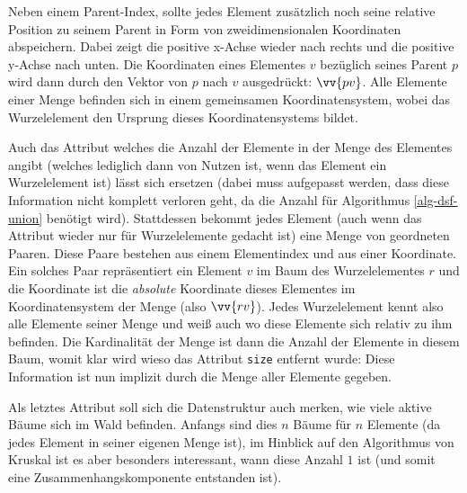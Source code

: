 \documentclass{whswinvcbook}
\begin{document}
Neben einem Parent-Index, sollte jedes Element zusätzlich noch seine relative Position zu seinem Parent in Form von zweidimensionalen Koordinaten abspeichern. Dabei zeigt die positive x-Achse wieder nach rechts und die positive y-Achse nach unten. Die Koordinaten eines Elementes $v$ bezüglich seines Parent $p$ wird dann durch den Vektor von $p$ nach $v$ ausgedrückt: $\vv{pv}$. Alle Elemente einer Menge befinden sich in einem gemeinsamen Koordinatensystem, wobei das Wurzelelement den Ursprung dieses Koordinatensystems bildet.

Auch das Attribut welches die Anzahl der Elemente in der Menge des Elementes angibt (welches lediglich dann von Nutzen ist, wenn das Element ein Wurzelelement ist) lässt sich ersetzen (dabei muss aufgepasst werden, dass diese Information nicht komplett verloren geht, da die Anzahl für Algorithmus \ref{alg-dsf-union} benötigt wird). Stattdessen bekommt jedes Element (auch wenn das Attribut wieder nur für Wurzelelemente gedacht ist) eine Menge von geordneten Paaren. Diese Paare bestehen aus einem Elementindex und aus einer Koordinate. Ein solches Paar repräsentiert ein Element $v$ im Baum des Wurzelelementes $r$ und die Koordinate ist die \textit{absolute} Koordinate dieses Elementes im Koordinatensystem der Menge (also $\vv{rv}$). Jedes Wurzelelement kennt also alle Elemente seiner Menge und weiß auch wo diese Elemente sich relativ zu ihm befinden. Die Kardinalität der Menge ist dann die Anzahl der Elemente in diesem Baum, womit klar wird wieso das Attribut \texttt{size} entfernt wurde: Diese Information ist nun implizit durch die Menge aller Elemente gegeben.

Als letztes Attribut soll sich die Datenstruktur auch merken, wie viele aktive Bäume sich im Wald befinden. Anfangs sind dies $n$ Bäume für $n$ Elemente (da jedes Element in seiner eigenen Menge ist), im Hinblick auf den Algorithmus von Kruskal ist es aber besonders interessant, wann diese Anzahl $1$ ist (und somit eine Zusammenhangskomponente entstanden ist).
\end{document}
